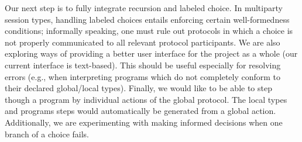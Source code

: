 \documentclass[runningheads]{llncs}
\begin{document}
Our next step is to fully integrate recursion and labeled choice. In
multiparty session types, handling labeled choices entails enforcing
certain well-formedness conditions; informally speaking, one must rule
out protocols in which a choice is not properly communicated to all
relevant protocol participants.
We are also exploring ways of providing a better user interface for
the project as a whole (our current interface is text-based). This
should be useful especially for resolving errors (e.g., when
interpreting programs which do not completely conform to their
declared global/local types).
Finally, we would like to be able to step though a program by
individual actions of the global protocol. The local types and
programs steps would automatically be generated from a global action.
Additionally, we are experimenting with making informed decisions when
one branch of a choice fails.
%
%
%
% 
 
 
%
\end{document}
